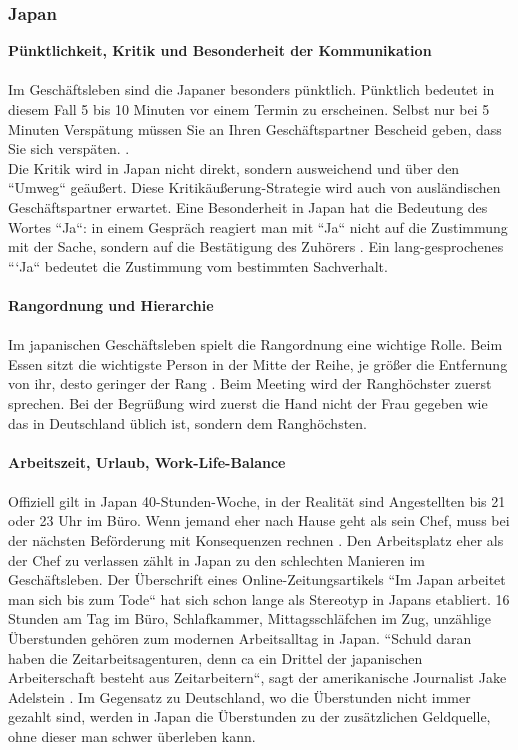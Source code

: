 	\subsubsection{Japan}
	\textbf{Pünktlichkeit, Kritik und Besonderheit der Kommunikation}\\
	\\
	Im Geschäftsleben sind die Japaner besonders pünktlich. Pünktlich bedeutet in diesem Fall 5 bis 10 Minuten vor einem Termin zu erscheinen. Selbst nur bei 5 Minuten Verspätung müssen Sie an Ihren Geschäftspartner Bescheid geben, dass Sie sich verspäten. \cite{JPKnigge}. \\
	Die Kritik wird in Japan nicht direkt, sondern ausweichend und über den ``Umweg`` geäußert. Diese Kritikäußerung-Strategie wird auch von ausländischen Geschäftspartner erwartet. Eine Besonderheit in Japan hat die Bedeutung des Wortes ``Ja``: in einem Gespräch reagiert man mit ``Ja`` nicht auf die Zustimmung mit der Sache, sondern auf die Bestätigung des Zuhörers \cite{JPKnigge}. Ein lang-gesprochenes ```Ja`` bedeutet die Zustimmung vom bestimmten Sachverhalt.\\
	\\
	\textbf{Rangordnung und Hierarchie}\\
	\\
	Im japanischen Geschäftsleben spielt die Rangordnung eine wichtige Rolle.
	Beim Essen sitzt die wichtigste Person in der Mitte der Reihe, je größer die Entfernung von ihr, desto geringer der Rang \cite{Business-KniggeFernost}.	
	Beim Meeting wird der Ranghöchster zuerst sprechen. Bei der Begrüßung wird zuerst die Hand nicht der Frau gegeben wie das in Deutschland üblich ist, sondern dem Ranghöchsten. \\
	\\
	\textbf{Arbeitszeit, Urlaub, Work-Life-Balance}\\
	\\
	Offiziell gilt in Japan 40-Stunden-Woche, in der Realität sind Angestellten bis 21 oder 23 Uhr im Büro. Wenn jemand eher nach Hause geht als sein Chef, muss bei der nächsten Beförderung mit Konsequenzen rechnen \cite{ArbZeitJP}. Den Arbeitsplatz eher als der Chef zu verlassen zählt in Japan zu den schlechten Manieren im Geschäftsleben.
	Der Überschrift eines Online-Zeitungsartikels ``Im Japan arbeitet man sich bis zum Tode`` hat sich schon lange als Stereotyp in Japans etabliert. 
	16 Stunden am Tag im Büro, Schlafkammer, Mittagsschläfchen im Zug, unzählige Überstunden gehören zum modernen Arbeitsalltag in Japan. ``Schuld daran haben die Zeitarbeitsagenturen, denn ca ein Drittel der japanischen Arbeiterschaft besteht aus Zeitarbeitern``, sagt der amerikanische Journalist Jake Adelstein \cite{JPArbeit}. Im Gegensatz zu Deutschland, wo die Überstunden nicht immer gezahlt sind, werden in Japan die Überstunden zu der zusätzlichen Geldquelle, ohne dieser man schwer überleben kann.
